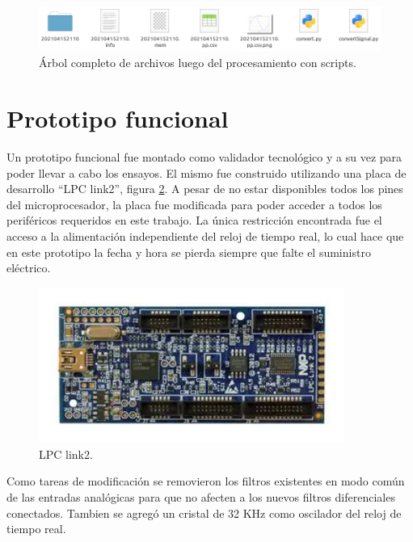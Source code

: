 \vspace{5mm}

\begin{figure}[ht]
	\centering
	\includegraphics[width=140mm]{./Figures/firmAllFiles.png}
	\caption{Árbol completo de archivos luego del procesamiento con scripts.}
	\label{fig:firmAllFiles}
\end{figure}

\section{Prototipo funcional}

Un prototipo funcional fue montado como validador tecnológico y a su vez para poder llevar a cabo los ensayos. El mismo fue construido utilizando una placa de desarrollo \enquote{LPC link2}, figura \ref{fig:hardLPC}. A pesar de no estar disponibles todos los pines del microprocesador, la placa fue modificada para poder acceder a todos los periféricos requeridos en este trabajo. La única restricción encontrada fue el acceso a la alimentación independiente del reloj de tiempo real, lo cual hace que en este prototipo la fecha y hora se pierda siempre que falte el suministro eléctrico. 

\begin{figure}[ht]
	\centering
	\includegraphics[width=100mm]{./Figures/hardLPC.png}
	\caption{LPC link2.}
	\label{fig:hardLPC}
\end{figure}

\vspace{10mm}

Como tareas de modificación se removieron los filtros existentes en modo común de las entradas analógicas para que no afecten a los nuevos filtros diferenciales conectados. Tambien se agregó un cristal de 32 KHz como oscilador del reloj de tiempo real.

